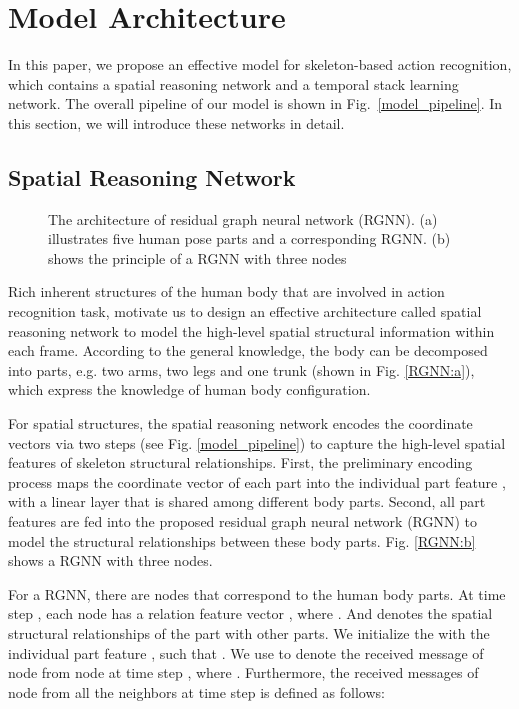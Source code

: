 \documentclass[runningheads]{llncs}
\begin{document}
\section{Model Architecture}
\label{Model Architecture}

In this paper, we propose an effective model for skeleton-based action recognition, which contains a spatial reasoning network and a temporal stack learning network. The overall pipeline of our model is shown in Fig.~\ref{model_pipeline}. In this section, we will introduce these networks in detail.

\subsection{Spatial Reasoning Network}

\begin{figure}[!b]
\centering
    \hspace{8mm}
\caption{The architecture of residual graph neural network (RGNN). (a) illustrates five human pose parts and a corresponding RGNN. (b) shows the principle of a RGNN with three nodes}
\label{RGNN}
\end{figure}

Rich inherent structures of the human body that are involved in action recognition task, motivate us to design an effective architecture called spatial reasoning network to model the high-level spatial structural information within each frame. According to the general knowledge, the body can be decomposed into  parts, e.g. two arms, two legs and one trunk (shown in Fig. \ref{RGNN:a}), which express the knowledge of human body configuration.

For spatial structures, the spatial reasoning network encodes the coordinate vectors via two steps (see Fig. \ref{model_pipeline}) to capture the high-level spatial features of skeleton structural relationships. First, the preliminary encoding process maps the coordinate vector of each part into the individual part feature ,  with a linear layer that is shared among different body parts. Second, all part features  are fed into the proposed residual graph neural network (RGNN) to model the structural relationships between these body parts. Fig. \ref{RGNN:b} shows a RGNN with three nodes.

For a RGNN, there are  nodes that correspond to the human body parts. At time step , each node has a relation feature vector , where . And  denotes the spatial structural relationships of the part  with other parts. We initialize the  with the individual part feature , such that . We use  to denote the received message of node  from node  at time step , where . Furthermore, the received messages  of node  from all the neighbors  at time step  is defined as follows:
\end{document}
